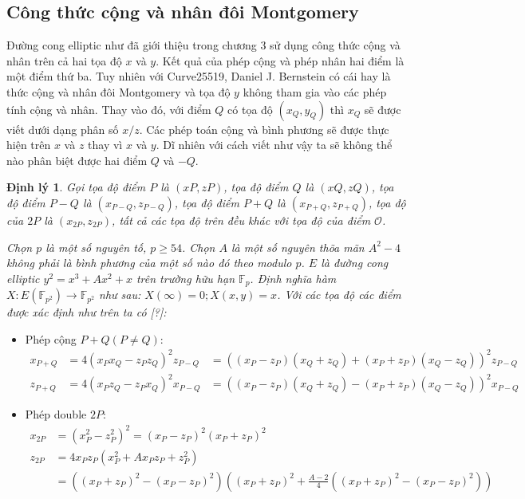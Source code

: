 \documentclass[a4paper,12pt]{report}
\newtheorem{theorem}{Định lý}[chapter]
\begin{document}
\subsection*{Công thức cộng và nhân đôi Montgomery}
Đường cong elliptic như đã giới thiệu trong chương 3 sử dụng công thức cộng và nhân trên cả hai tọa độ $x$ và $y$. Kết quả của phép cộng và phép nhân hai điểm là một điểm thứ ba. Tuy nhiên với Curve25519, Daniel J. Bernstein có cái hay là thức cộng và nhân đôi Montgomery và tọa độ $y$ không tham gia vào các phép tính cộng và nhân. Thay vào đó, với điểm $Q$ có tọa độ
$(x_Q, y_Q)$ thì $x_Q$ sẽ được viết dưới dạng phân số $x/z$. Các phép toán cộng và bình phương sẽ được thực hiện trên $x$ và $z$ thay vì $x$ và $y$. Dĩ nhiên với cách viết như vậy ta sẽ không thể nào phân biệt được hai điểm $Q$ và $-Q$.
\begin{theorem}
Gọi tọa độ điểm $P$ là $(xP, zP)$, tọa độ điểm $Q$ là $(xQ, zQ)$, tọa độ điểm $P - Q$ là $(x_{P-Q}, z_{P-Q})$, tọa độ điểm $P + Q$ là $(x_{P+Q}, z_{P+Q})$, tọa độ của $2P$ là $(x_{2P}, z_{2P})$, tất cả các tọa độ trên đều khác với tọa độ của điểm $\mathcal{O}$.

Chọn $p$ là một số nguyên tố, $p \geq 54$. Chọn $A$ là một số nguyên thõa mãn $A^2 - 4$ không phải là bình phương của một số nào đó theo modulo $p$. $E$ là đường cong elliptic $y^2 = x^3 + Ax^2 + x$ trên trường hữu hạn $\mathbb{F}_p$. Định nghĩa hàm $X : E(\mathbb{F}_{p^2}) \rightarrow \mathbb{F}_{p^2}$ như sau: $X(\infty) = 0; X(x, y) = x$. Với các tọa độ các điểm được xác định như trên ta có [?]:
\end{theorem} 
\begin{itemize}
\item[] Phép cộng $P + Q (P \neq Q)$:
\begin{displaymath}
\begin{aligned}
x_{P+Q} & = 4(x_P x_Q - z_Pz_Q)^2z_{P-Q} & = ((x_P - z_P)(x_Q + z_Q) + (x_P + z_P)(x_Q - z_Q))^2z_{P-Q} \\
z_{P+Q} & = 4(x_Pz_Q - z_Px_Q)^2x_{P-Q} & = ((x_P - z_P)(x_Q + z_Q) - (x_P + z_P)(x_Q - z_Q))^2x_{P-Q}
\end{aligned}
\end{displaymath}
\item[] Phép double $2P$:
\begin{displaymath}
\begin{aligned}
x_{2P} & = (x^2_P - z^2_P)^2  = (x_P - z_P)^2(x_P + z_P)^2 \\
z_{2P} & = 4x_Pz_P(x^2_P + Ax_Pz_P + z^2_P) \\ & = ((x_P + z_P)^2 - (x_P - z_P)^2)\left((x_P + z_P)^2 + \frac{A - 2}{4}((x_P + z_P)^2 - (x_P - z_P)^2) \right)
\end{aligned}
\end{displaymath}
\end{itemize}
\end{document}
